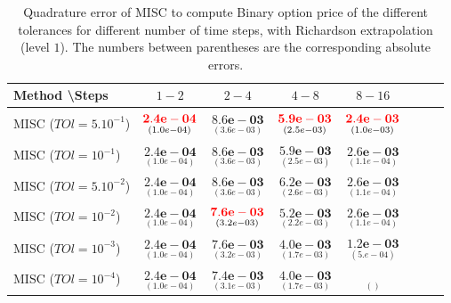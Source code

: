 \documentclass[11pt]{article}
\begin{document}
\begin{table}[h!]
	\centering
	\begin{tabular}{l*{6}{c}r}
		Method \textbackslash  Steps            & $1-2$ & $2-4$ & $4-8$ & $8-16$  \\
		\hline
		MISC ($TOl=5.10^{-1}$)  & $\underset{(   1.0e-04)}{\mathbf{ {\color{red}2.4e-04}}}$ & $\underset{(3.6e-03)}{\mathbf{8.6e-03}}$  & $\underset{(2.5e-03)}{\mathbf{{\color{red}5.9e-03}}}$ &$\underset{(1.0e-03)}{\mathbf{{\color{red}2.4e-03}}}$ \\
		MISC ($TOl=10^{-1}$)   & $\underset{(   1.0e-04)}{\mathbf{ 2.4e-04}}$ & $\underset{(3.6e-03)}{\mathbf{8.6e-03}}$  & $\underset{(2.5e-03)}{\mathbf{5.9e-03}}$ &$\underset{(   1.1e-04)}{\mathbf{ 2.6e-03}}$ \\
		MISC ($TOl=5.10^{-2}$)  & $\underset{(   1.0e-04)}{\mathbf{ 2.4e-04}}$ & $\underset{(3.6e-03)}{\mathbf{8.6e-03}}$ & $\underset{(2.6e-03)}{\mathbf{6.2e-03}}$ &$\underset{(   1.1e-04)}{\mathbf{ 2.6e-03}}$ \\
		MISC ($TOl=10^{-2}$)  & $\underset{(   1.0e-04)}{\mathbf{ 2.4e-04}}$ & $\underset{(3.2e-03)}{\mathbf{{\color{red}7.6e-03}}}$  & $\underset{(2.2e-03)}{\mathbf{5.2e-03}}$ &$\underset{(   1.1e-04)}{\mathbf{ 2.6e-03}}$\\
		MISC ($TOl=10^{-3}$)  & $\underset{(   1.0e-04)}{\mathbf{ 2.4e-04}}$ & $\underset{(3.2e-03)}{\mathbf{7.6e-03}}$  & $\underset{(1.7e-03)}{\mathbf{4.0e-03}}$ &$\underset{(   5.e-04)}{\mathbf{1.2e-03}}$ \\
	MISC ($TOl=10^{-4}$)  & $\underset{(   1.0e-04)}{\mathbf{ 2.4e-04}}$ & $\underset{(3.1e-03)}{\mathbf{7.4e-03}}$  & $\underset{(1.7e-03)}{\mathbf{4.0e-03}}$ &$\underset{()}{\mathbf{}}$ \\
		\hline
	\end{tabular}
	\caption{Quadrature error of MISC to compute Binary option price of the different tolerances for different number of time steps, with Richardson extrapolation (level $1$). The numbers between parentheses are the corresponding absolute errors.}
	\label{Quadrature error of MISC to compute Binary option price of the different tolerances for different number of time steps, with Richardson extrapolation (level $1$). The numbers between parentheses are the corresponding absolute errors.}
\end{table}
\end{document}
